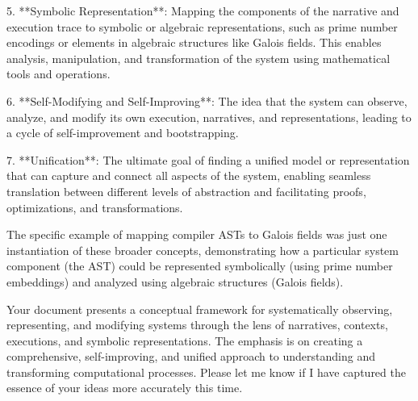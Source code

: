 \documentclass{article}
\begin{document}
5. **Symbolic Representation**: Mapping the components of the narrative and execution trace to symbolic or algebraic representations, such as prime number encodings or elements in algebraic structures like Galois fields. This enables analysis, manipulation, and transformation of the system using mathematical tools and operations.

6. **Self-Modifying and Self-Improving**: The idea that the system can observe, analyze, and modify its own execution, narratives, and representations, leading to a cycle of self-improvement and bootstrapping.

7. **Unification**: The ultimate goal of finding a unified model or representation that can capture and connect all aspects of the system, enabling seamless translation between different levels of abstraction and facilitating proofs, optimizations, and transformations.

The specific example of mapping compiler ASTs to Galois fields was just one instantiation of these broader concepts, demonstrating how a particular system component (the AST) could be represented symbolically (using prime number embeddings) and analyzed using algebraic structures (Galois fields).

Your document presents a conceptual framework for systematically observing, representing, and modifying systems through the lens of narratives, contexts, executions, and symbolic representations. The emphasis is on creating a comprehensive, self-improving, and unified approach to understanding and transforming computational processes. Please let me know if I have captured the essence of your ideas more accurately this time.


 
\end{document}
